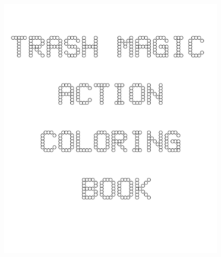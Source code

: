 \documentclass[17pt]{extreport}
\begin{document}
	

        \begin{figure}
		\centering
		\includegraphics[width=6.25in]{imageserver/uploadimages/cover.png}
	\end{figure}
	
\end{document}
